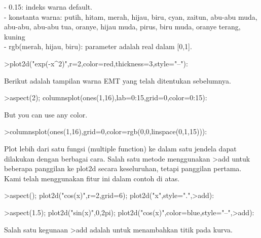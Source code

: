 \documentclass[a4paper,10pt]{article}
\begin{document}
\begin{eulernotebook}
\begin{eulercomment}
\begin{eulercomment}
\begin{eulercomment}
\begin{eulercomment}
\begin{eulercomment}
\begin{eulercomment}
\begin{eulercomment}
\begin{eulercomment}
\begin{eulercomment}
- 0.15: indeks warna default.\\
- konstanta warna: putih, hitam, merah, hijau, biru, cyan, zaitun,
abu-abu muda, abu-abu, abu-abu tua, oranye, hijau muda, pirus, biru
muda, oranye terang, kuning\\
- rgb(merah, hijau, biru): parameter adalah real dalam [0,1].
\end{eulercomment}
\begin{eulerprompt}
>plot2d("exp(-x^2)",r=2,color=red,thickness=3,style="--"):
\end{eulerprompt}
\begin{eulercomment}
Berikut adalah tampilan warna EMT yang telah ditentukan sebelumnya.
\end{eulercomment}
\begin{eulerprompt}
>aspect(2); columnsplot(ones(1,16),lab=0:15,grid=0,color=0:15):
\end{eulerprompt}
\begin{eulercomment}
But you can use any color.
\end{eulercomment}
\begin{eulerprompt}
>columnsplot(ones(1,16),grid=0,color=rgb(0,0,linspace(0,1,15))):
\end{eulerprompt}
\begin{eulercomment}
Plot lebih dari satu fungsi (multiple function) ke dalam satu jendela
dapat dilakukan dengan berbagai cara. Salah satu metode menggunakan
\textgreater{}add untuk beberapa panggilan ke plot2d secara keseluruhan, tetapi
panggilan pertama. Kami telah menggunakan fitur ini dalam contoh di
atas.
\end{eulercomment}
\begin{eulerprompt}
>aspect(); plot2d("cos(x)",r=2,grid=6); plot2d("x",style=".",>add):
\end{eulerprompt}
\begin{eulerprompt}
>aspect(1.5); plot2d("sin(x)",0,2pi); plot2d("cos(x)",color=blue,style="--",>add):
\end{eulerprompt}
\begin{eulercomment}
Salah satu kegunaan \textgreater{}add adalah untuk menambahkan titik pada kurva.
\end{eulercomment}

\end{eulercomment}
\end{eulercomment}
\end{eulercomment}
\end{eulercomment}
\end{eulercomment}
\end{eulercomment}
\end{eulercomment}
\end{eulercomment}
\end{eulernotebook}
\end{document}
